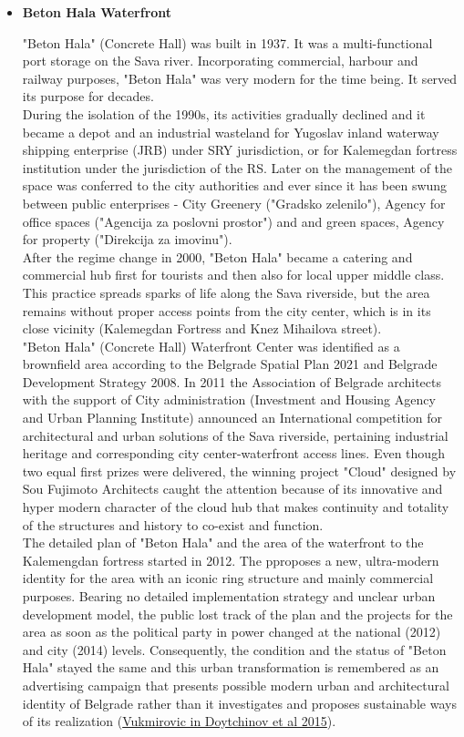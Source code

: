 \documentclass[11pt]{report}
\begin{document}
\begin{itemize}
\item \textbf{Beton Hala Waterfront}

"Beton Hala" (Concrete Hall) was built in 1937. It was a multi-functional port storage on the Sava river. Incorporating commercial, harbour and railway purposes, "Beton Hala" was very modern for the time being. It served its purpose for decades.
\\
During the isolation of the 1990s, its activities gradually declined and it became a depot and an industrial wasteland for Yugoslav inland waterway shipping enterprise (JRB) under SRY jurisdiction, or for Kalemegdan fortress institution under the jurisdiction of the RS.
Later on the management of the space was conferred to the city authorities and ever since it has been swung between public enterprises - City Greenery ("Gradsko zelenilo"), Agency for office spaces ("Agencija za poslovni prostor") and and green spaces, Agency for property ("Direkcija za imovinu").
\\
After the regime change in 2000, "Beton Hala" became a catering and commercial hub first for tourists and then also for local upper middle class. This practice spreads sparks of life along the Sava riverside, but the area remains without proper access points from the city center, which is in its close vicinity (Kalemegdan Fortress and Knez Mihailova street).
\\
"Beton Hala" (Concrete Hall) Waterfront Center was identified as a brownfield area according to the Belgrade Spatial Plan 2021 and Belgrade Development Strategy 2008. In 2011 the Association of Belgrade architects with the support of City administration (Investment and Housing Agency and Urban Planning Institute) announced an International competition for architectural and urban solutions of the Sava riverside, pertaining industrial heritage and corresponding city center-waterfront access lines.
Even though two equal first prizes were delivered, the winning project "Cloud"  designed  by  Sou  Fujimoto  Architects caught the attention because of its innovative and hyper modern character of the cloud hub that makes continuity and totality of the structures and history to co-exist and function.
\\
The detailed plan of "Beton Hala"  and the area of the waterfront to the Kalemengdan fortress started  in 2012. The pproposes a new, ultra-modern identity for the area with an iconic ring structure and mainly commercial purposes.
Bearing no detailed implementation strategy and unclear urban development model, the public lost track of the plan and the projects for the area as soon as the political party in power changed at the national (2012) and city (2014) levels.
Consequently, the condition and the status of "Beton Hala" stayed the same and this urban transformation is remembered as an advertising campaign that presents possible modern urban and architectural identity of Belgrade rather than it investigates and proposes sustainable ways of its realization (\href{}{Vukmirovic in Doytchinov et al 2015}).


\end{itemize}
\end{document}
